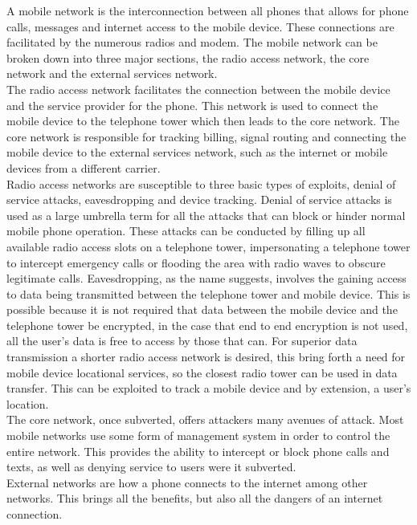 A mobile network is the interconnection between all phones that allows for phone calls, messages and internet access to the mobile device. These connections are facilitated by the numerous radios and modem. The mobile network can be broken down into three major sections, the radio access network, the core network and the external services network.\\
The radio access network facilitates the connection between the mobile device and the service provider for the phone. This network is used to connect the mobile device to the telephone tower which then leads to the core network. The core network is responsible for tracking billing, signal routing and connecting the mobile device to the external services network, such as the internet or mobile devices from a different carrier.\cite{Reference13}\\ 
Radio access networks are susceptible to three basic types of exploits, denial of service attacks, eavesdropping and device tracking. Denial of service attacks is used as a large umbrella term for all the attacks that can block or hinder normal mobile phone operation. These attacks can be conducted by filling up all available radio access slots on a telephone tower, impersonating a telephone tower to intercept emergency calls or flooding the area with radio waves to obscure legitimate calls.\cite{Reference17} Eavesdropping, as the name suggests, involves the gaining access to data being transmitted between the telephone tower and mobile device. This is possible because it is not required that data between the mobile device and the telephone tower be encrypted, in the case that end to end encryption is not used, all the user’s data is free to access by those that can.\cite{Reference13} For superior data transmission a shorter radio access network is desired, this bring forth a need for mobile device locational services, so the closest radio tower can be used in data transfer. This can be exploited to track a mobile device and by extension, a user’s location.\cite{Reference17}\\
The core network, once subverted, offers attackers many avenues of attack. Most mobile networks use some form of management system in order to control the entire network. This provides the ability to intercept or block phone calls and texts, as well as denying service to users were it subverted.\cite{Reference13}\\
External networks are how a phone connects to the internet among other networks. This brings all the benefits, but also all the dangers of an internet connection.\\
